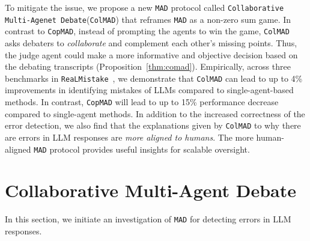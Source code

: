\documentclass{article} %
\newcommand{\oursfull}[0]{\texttt{Collaborative Multi-Agenet Debate}\xspace}
\newcommand{\ours}[0]{\texttt{ColMAD}\xspace}
\newcommand{\copmad}[0]{\texttt{CopMAD}\xspace}
\newcommand{\mad}[0]{\texttt{MAD}\xspace}
\newcommand{\real}[0]{\texttt{ReaLMistake}\xspace}
\newcommand{\my}[1]{{\color{deepgreen}{(Mao: #1)}}}
\begin{document}
To mitigate the issue, we propose a new \mad protocol called \oursfull (\ours) that reframes \mad as a non-zero sum game.
In contrast to \copmad, instead of prompting the agents to win the game, \ours asks debaters to \textit{collaborate} and complement each other's missing points. Thus, the judge agent could make a more informative and objective decision based on the debating transcripts (Proposition~\ref{thm:comad}). Empirically, across three benchmarks in \real~\citep{realmistake}, we demonstrate that \ours can lead to up to 4\% improvements in identifying mistakes of LLMs compared to single-agent-based methods. In contrast, \copmad will lead to up to 15\% performance decrease compared to single-agent methods.
%
In addition to the increased correctness of the error detection, we also find that the explanations given by \ours to why there are errors in LLM responses are \textit{more aligned to humans}. The more human-aligned \mad protocol provides useful insights for scalable oversight.

\section{Collaborative Multi-Agent Debate}
\label{sec:method}
In this section, we initiate an investigation of \mad for detecting errors in LLM responses. 
\end{document}
